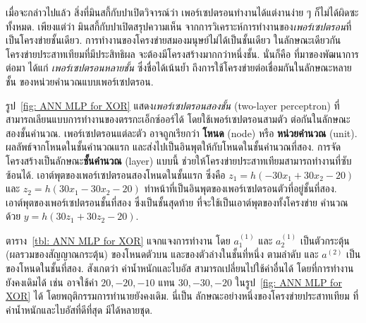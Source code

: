 เมื่อจะกล่าวไปแล้ว สิ่งที่มินสกี้กับปาเปิตวิจารณ์ว่า เพอร์เซปตรอนทำงานได้แต่งานง่าย ๆ ก็ไม่ได้ผิดซะทั้งหมด.
เพียงแต่ว่า มินสกี้กับปาเปิตสรุปความเห็น จากการวิเคราะห์การทำงานของ\textit{เพอร์เซปตรอน}ที่เป็นโครงข่ายชั้นเดียว.
การทำงานของโครงข่ายสมองมนุษย์ไม่ได้เป็นชั้นเดียว 
ในลักษณะเดียวกัน
โครงข่ายประสาทเทียมที่มีประสิทธิผล จะต้องมีโครงสร้างมากกว่าหนึ่งชั้น.
นั่นก็คือ ที่มาของพัฒนาการต่อมา ได้แก่ \textit{เพอร์เซปตรอนหลายชั้น} ซึ่งชื่อได้เน้นย้ำ
ถึงการใช้โครงข่ายต่อเชื่อมกันในลักษณะหลายชั้น
ของหน่วยคำนวณแบบเพอร์เซปตรอน.

รูป~\ref{fig: ANN MLP for XOR} แสดง\textit{เพอร์เซปตรอนสองชั้น} (two-layer perceptron) ที่สามารถเลียนแบบการทำงานของตรรกะเอ็กซ์ออร์ได้
โดยใช้เพอร์เซปตรอนสามตัว ต่อกันในลักษณะสองชั้นคำนวณ.
เพอร์เซปตรอนแต่ละตัว อาจถูกเรียกว่า
\textbf{โหนด} (node) หรือ \textbf{หน่วยคำนวณ} (unit).
ผลลัพธ์จากโหนดในชั้นคำนวณแรก
และส่งไปเป็นอินพุตให้กับโหนดในชั้นคำนวณที่สอง.
การจัดโครงสร้างเป็นลักษณะ\textbf{ชั้นคำนวณ} (layer) แบบนี้
ช่วยให้โครงข่ายประสาทเทียมสามารถทำงานที่ซับซ้อนได้.
เอาต์พุตของเพอร์เซปตรอนสองโหนดในชั้นแรก ซึ่งคือ $z_1 = h(-30 x_1 + 30 x_2 - 20)$ และ $z_2 = h(30 x_1 - 30 x_2 - 20)$
ทำหน้าที่เป็นอินพุตของเพอร์เซปตรอนตัวที่อยู่ชั้นที่สอง.
เอาต์พุตของเพอร์เซปตรอนชั้นที่สอง 
ซึ่งเป็นชั้นสุดท้าย ที่จะใช้เป็นเอาต์พุตของทั้งโครงข่าย
คำนวณด้วย $y = h(30 z_1 + 30 z_2 - 20)$.

ตาราง~\ref{tbl: ANN MLP for XOR} แจกแจงการทำงาน โดย $a^{(1)}_1$
และ $a^{(1)}_2$ เป็นตัวกระตุ้น (ผลรวมของสัญญาณกระตุ้น) ของโหนดตัวบน และของตัวล่างในชั้นที่หนึ่ง ตามลำดับ
และ $a^{(2)}$ เป็นของโหนดในชั้นที่สอง.
สังเกตว่า ค่าน้ำหนักและไบอัส
สามารถเปลี่ยนไปใช้ค่าอื่นได้ โดยที่การทำงานยังคงเดิมได้ 
เช่น อาจใช้ค่า $20, -20, -10$ แทน $30, -30, -20$ ในรูป~\ref{fig: ANN MLP for XOR} ได้ โดยพฤติกรรมการทำนายยังคงเดิม.
นี่เป็น
ลักษณะอย่างหนึ่งของโครงข่ายประสาทเทียม 
ที่ ค่าน้ำหนักและไบอัสที่ดีที่สุด มีได้หลายชุด.


